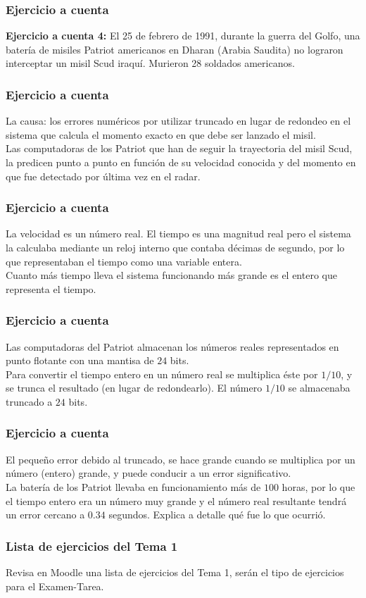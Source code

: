 \documentclass[12pt]{beamer}
\begin{document}
\begin{frame}
\frametitle{Ejercicio a cuenta}
\textbf{Ejercicio a cuenta 4: } El 25 de febrero de 1991, durante la guerra del Golfo, una batería de misiles Patriot americanos en Dharan (Arabia Saudita) no lograron interceptar un misil Scud iraquí. Murieron 28 soldados americanos.
\end{frame}
\begin{frame}
\frametitle{Ejercicio a cuenta}
La causa: los errores numéricos por utilizar truncado en lugar de redondeo en el sistema que calcula el momento exacto en que debe ser lanzado el misil.
\\
\bigskip
\pause
Las computadoras de los Patriot que han de seguir la trayectoria del misil Scud, la predicen punto a punto en función de su velocidad conocida y del momento en que fue detectado por última vez en el radar.
\end{frame}
\begin{frame}
\frametitle{Ejercicio a cuenta}
La velocidad es un número real. El tiempo es una magnitud real pero el sistema la calculaba mediante un reloj interno que contaba décimas de segundo, por lo que representaban el tiempo como una variable entera.
\\
\bigskip
\pause
Cuanto más tiempo lleva el sistema funcionando más grande es el entero que representa el tiempo.
\end{frame}
\begin{frame}
\frametitle{Ejercicio a cuenta}
Las computadoras del Patriot almacenan los números reales representados en punto flotante con una mantisa de $24$ bits.
\\
\bigskip
\pause
Para convertir el tiempo entero en un número real se multiplica éste por $1/10$, y se trunca el resultado (en lugar de redondearlo). El número $1/10$ se almacenaba truncado a $24$ bits.
\end{frame}
\begin{frame}
\frametitle{Ejercicio a cuenta}
El pequeño error debido al truncado, se hace grande cuando se multiplica por un número (entero) grande, y puede conducir a un error significativo.
\\
\bigskip
La batería de los Patriot llevaba en funcionamiento más de $100$ horas, por lo que el tiempo entero era un número muy grande y el número real resultante tendrá un error cercano a $0.34$ segundos. \pause Explica a detalle qué fue lo que ocurrió.
\end{frame}
\begin{frame}
\frametitle{Lista de ejercicios del Tema 1}
Revisa en Moodle una lista de ejercicios del Tema 1, serán el tipo de ejercicios para el Examen-Tarea.
\end{frame}
\end{document}
